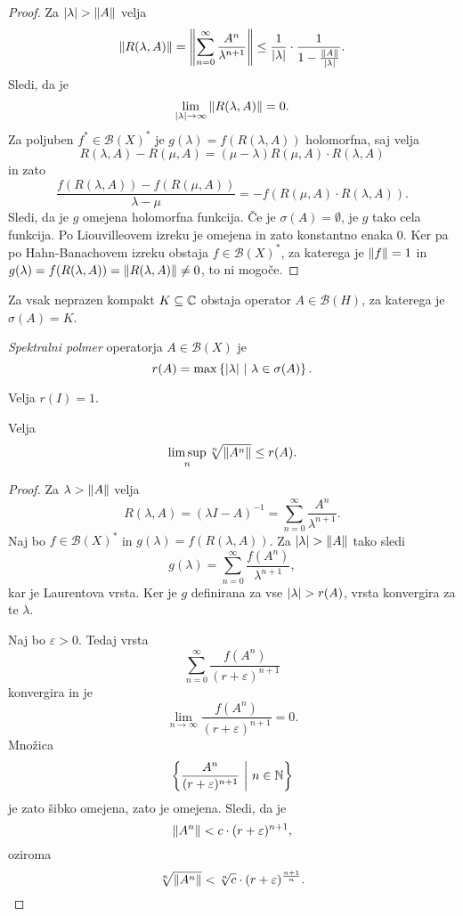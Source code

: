 \begin{proof}
Za $\left\lvert \lambda\right\rvert > \left\lVert A\right\rVert$ velja
\[
\left\lVert R(\lambda, A)\right\rVert =
\left\lVert \sum_{n=0}^\infty \frac{A^n}{\lambda^{n+1}}\right\rVert \leq
\frac{1}{\left\lvert \lambda\right\rvert} \cdot
\frac{1}{1 - \frac{\left\lVert A\right\rVert}{\left\lvert \lambda\right\rvert}}.
\]
Sledi, da je
\[
\lim_{\left\lvert \lambda\right\rvert \to \infty} \left\lVert R(\lambda, A)\right\rVert = 0.
\]
Za poljuben $f^* \in \mathcal{B}(X)^*$ je
$g(\lambda) = f(R(\lambda, A))$ holomorfna, saj velja
\[
R(\lambda, A) - R(\mu, A) =
(\mu - \lambda) R(\mu, A) \cdot R(\lambda, A)
\]
in zato
\[
\frac{f(R(\lambda, A)) - f(R(\mu, A))}{\lambda - \mu} =
- f(R(\mu, A) \cdot R(\lambda, A)).
\]
Sledi, da je $g$ omejena holomorfna funkcija. Če je
$\sigma(A) = \emptyset$, je $g$ tako cela funkcija. Po
Liouvilleovem izreku je omejena in zato konstantno enaka $0$. Ker
pa po Hahn-Banachovem izreku obstaja $f \in \mathcal{B}(X)^*$, za
katerega je $\left\lVert f\right\rVert = 1$ in
$g(\lambda) = f(R(\lambda, A)) = \left\lVert R(\lambda, A)\right\rVert \ne 0$,
to ni mogoče.
\end{proof}


\begin{opomba}
Za vsak neprazen kompakt $K \subseteq \mathbb{C}$ obstaja operator
$A \in \mathcal{B}(H)$, za katerega je $\sigma(A) = K$.
\end{opomba}

\begin{definicija}
\emph{Spektralni polmer} operatorja
$A \in \mathcal{B}(X)$ je
\[
r(A) = \max \left\{\left\lvert \lambda\right\rvert~\middle\vert~\lambda \in \sigma(A)\right\}.
\]
\end{definicija}

\begin{zgled}
Velja $r(I) = 1$.
\end{zgled}

\begin{lema}
Velja
\[
\limsup_n \sqrt[n]{\left\lVert A^n\right\rVert} \leq r(A).
\]
\end{lema}

\begin{proof}
Za $\lambda > \left\lVert A\right\rVert$ velja
\[
R(\lambda,A) = (\lambda I - A)^{-1} =
\sum_{n=0}^\infty \frac{A^n}{\lambda^{n+1}}.
\]
Naj bo $f \in \mathcal{B}(X)^*$ in $g(\lambda) = f(R(\lambda, A))$.
Za $\left\lvert \lambda\right\rvert > \left\lVert A\right\rVert$ tako sledi
\[
g(\lambda) = \sum_{n=0}^\infty \frac{f(A^n)}{\lambda^{n+1}},
\]
kar je Laurentova vrsta. Ker je $g$ definirana za vse
$\left\lvert \lambda\right\rvert > r(A)$, vrsta konvergira za te $\lambda$.

Naj bo $\varepsilon > 0$. Tedaj vrsta
\[
\sum_{n=0}^\infty \frac{f(A^n)}{(r+\varepsilon)^{n+1}}
\]
konvergira in je
\[
\lim_{n \to \infty} \frac{f(A^n)}{(r+\varepsilon)^{n+1}} = 0.
\]
Množica
\[
\left\{\frac{A^n}{(r+\varepsilon)^{n+1}}~\middle\vert~n \in \mathbb{N}\right\}
\]
je zato šibko omejena, zato je omejena. Sledi, da je
\[
\left\lVert A^n\right\rVert < c \cdot (r+\varepsilon)^{n+1},
\]
oziroma
\[
\sqrt[n]{\left\lVert A^n\right\rVert} <
\sqrt[n]{c} \cdot (r+\varepsilon)^{\frac{n+1}{n}}. \qedhere
\]
\end{proof}

